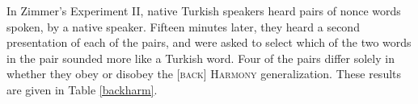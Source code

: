 

In Zimmer's Experiment II, native Turkish speakers heard pairs of nonce words spoken, by a native speaker. Fifteen minutes later, they heard a second presentation of each of the pairs, and were asked to select which of the two words in the pair sounded more like a Turkish word. Four of the pairs differ solely in whether they obey or disobey the [\textsc{back}] \textsc{Harmony} generalization. These results are given in Table \ref{backharm}.

